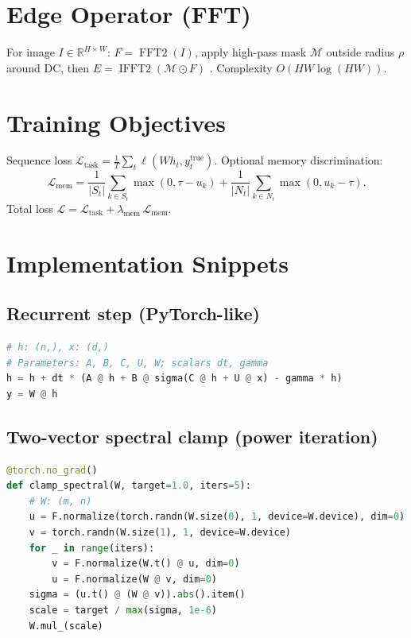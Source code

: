 \documentclass[11pt]{article}
\begin{document}
\section{Edge Operator (FFT)}
For image $I\in\mathbb R^{H\times W}$: $F=\operatorname{FFT2}(I)$, apply high-pass mask $\mathcal M$ outside radius $\rho$ around DC, then $E=\operatorname{IFFT2}(\mathcal M\odot F)$ \cite{CooleyTukey1965}. Complexity $O(HW\log(HW))$.

\section{Training Objectives}
Sequence loss $\mathcal L_{\text{task}} = \tfrac1T\sum_t \ell(Wh_t, y_t^{\text{true}})$.
Optional memory discrimination:
\begin{equation}
\mathcal L_{\text{mem}} = \frac{1}{|S_t|}\sum_{k\in S_t} \max(0,\tau-u_k) + \frac{1}{|N_t|}\sum_{k\in N_t} \max(0, u_k-\tau).
\end{equation}
Total loss $\mathcal L=\mathcal L_{\text{task}}+\lambda_{\text{mem}}\,\mathcal L_{\text{mem}}$.

\section{Implementation Snippets}
\subsection*{Recurrent step (PyTorch-like)}
\begin{lstlisting}[language=Python]
# h: (n,), x: (d,)
# Parameters: A, B, C, U, W; scalars dt, gamma
h = h + dt * (A @ h + B @ sigma(C @ h + U @ x) - gamma * h)
y = W @ h
\end{lstlisting}

\subsection*{Two-vector spectral clamp (power iteration)}
\begin{lstlisting}[language=Python]
@torch.no_grad()
def clamp_spectral(W, target=1.0, iters=5):
    # W: (m, n)
    u = F.normalize(torch.randn(W.size(0), 1, device=W.device), dim=0)
    v = torch.randn(W.size(1), 1, device=W.device)
    for _ in range(iters):
        v = F.normalize(W.t() @ u, dim=0)
        u = F.normalize(W @ v, dim=0)
    sigma = (u.t() @ (W @ v)).abs().item()
    scale = target / max(sigma, 1e-6)
    W.mul_(scale)
\end{lstlisting}
\end{document}
